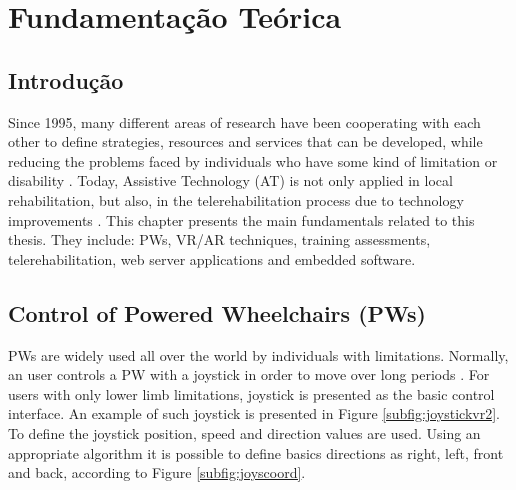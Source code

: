 \chapter{Fundamentação Teórica}

\section{Introdução}

Since 1995, many different areas of research have been cooperating with each other to define strategies, resources and services that can be developed, while reducing the problems faced by individuals who have some kind of limitation or disability \cite{ludy1995}. Today, Assistive Technology (AT) is not only applied in local rehabilitation, but also, in the telerehabilitation process due to technology improvements \cite{barriga2016}. This chapter presents the main fundamentals related to this thesis. They include: PWs, VR/AR techniques, training assessments, telerehabilitation, web server applications and embedded software.

\section{Control of Powered Wheelchairs (PWs)}
\label{sec:ewheelchair}

PWs are widely used all over the world by individuals with limitations. Normally, an user controls a PW with a joystick in order to move over long periods \cite{fattouh2004}. For users with only lower limb limitations, joystick is presented as the basic control interface. An example of such joystick is presented in Figure \ref{subfig:joystickvr2}.  To define the joystick position, speed and direction values are used. Using an appropriate algorithm it is possible to define basics directions as right, left, front and back, according to Figure \ref{subfig:joyscoord}.


